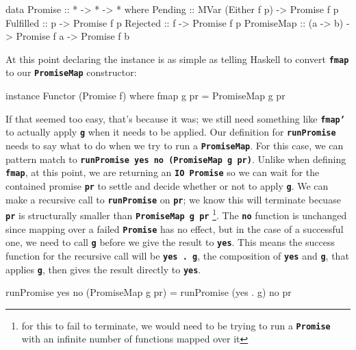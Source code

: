 \documentclass[12pt, english, letterpaper]{kuthesis}
\newcommand{\lit}[1]{\textbf{\texttt{#1}}}
\begin{document}
\begin{code}
data Promise :: * -> * -> * where
    Pending :: MVar (Either f p) -> Promise f p
    Fulfilled :: p -> Promise f p
    Rejected :: f -> Promise f p
    PromiseMap :: (a -> b) -> Promise f a -> Promise f b
\end{code}

At this point declaring the instance is as simple as telling Haskell to convert \lit{fmap} to our \lit{PromiseMap} constructor:
\begin{code}
instance Functor (Promise f) where
    fmap g pr = PromiseMap g pr
\end{code}
If that seemed too easy, that's because it was; we still need something like \lit{fmap'} to actually apply \lit g when it needs to be applied.  Our definition for \lit{runPromise} needs to say what to do when we try to run a \lit{PromiseMap}.  For this case, we can pattern match to \lit{runPromise yes no (PromiseMap g pr)}.  Unlike when defining \lit{fmap}, at this point, we are returning an \lit{IO Promise} so we can wait for the contained promise \lit{pr} to settle and decide whether or not to apply \lit g.  We can make a recursive call to \lit{runPromise} on \lit{pr}; we know this will terminate becuase \lit{pr} is structurally smaller than \lit{PromiseMap g pr} \footnote{for this to fail to terminate, we would need to be trying to run a \lit{Promise} with an infinite number of functions mapped over it}.  The \lit{no} function is unchanged since mapping over a failed \lit{Promise} has no effect, but in the case of a successful one, we need to call \lit g before we give the result to \lit{yes}.  This means the success function for the recursive call will be \lit{yes . g}, the composition of \lit{yes} and \lit g, that applies \lit g, then gives the result directly to \lit{yes}.
\begin{code}
runPromise yes no (PromiseMap g pr) = runPromise (yes . g) no pr
\end{code}
\end{document}
